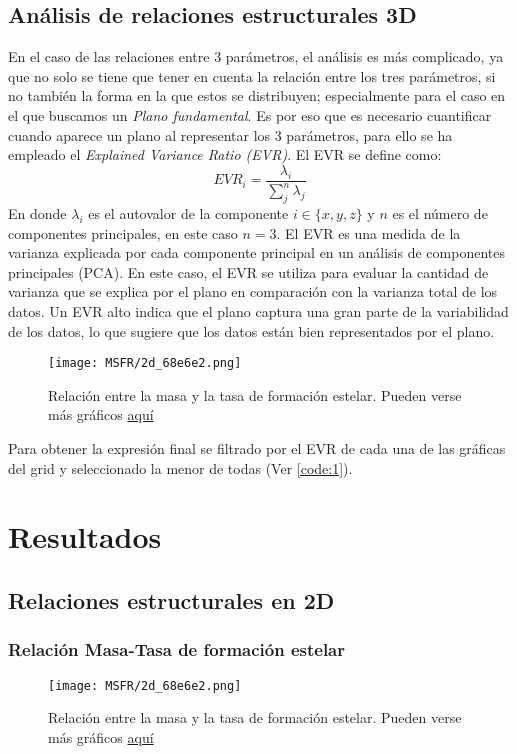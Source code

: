 \documentclass[11pt, a4paper]{article} %
\begin{document}
\subsection{Análisis de relaciones estructurales 3D}

En el caso de las relaciones entre 3 parámetros, el análisis es más complicado, ya que no solo se tiene que tener en cuenta la relación entre los tres parámetros, si no también la forma en la que estos se distribuyen; especialmente para el caso en el que buscamos un \textit{Plano fundamental}. 
Es por eso que es necesario cuantificar cuando aparece un plano al representar los 3 parámetros, para ello se ha empleado el \textit{Explained Variance Ratio (EVR)}. El EVR se define como:
\begin{equation}
    EVR_i=\frac{\lambda_i}{\sum_j^n\lambda_j}
\end{equation}
En donde $\lambda_i$ es el autovalor de la componente $i\in\{x,y,z\}$ y $n$ es el número de componentes principales, en este caso $n=3$.
El EVR es una medida de la varianza explicada por cada componente principal en un análisis de componentes principales (PCA). 
En este caso, el EVR se utiliza para evaluar la cantidad de varianza que se explica por el plano en comparación con la varianza total de los datos. Un EVR alto indica que el plano captura una gran parte de la variabilidad de los datos, lo que sugiere que los datos están bien representados por el plano.

\begin{figure}[H]
    \centering
    \texttt{[image: MSFR/2d\_68e6e2.png]}
    \caption{Relación entre la masa y la tasa de formación estelar. Pueden verse más gráficos \href{https://github.com/PhyAMR/TFG/tree/main/MSFR}{aquí}}
    \label{fig:MSFR}
\end{figure}

Para obtener la expresión final se filtrado por el EVR de cada una de las gráficas del grid y seleccionado la menor de todas (Ver \ref{code:1}).



\section{Resultados}

\subsection{Relaciones estructurales en 2D}
\subsubsection{Relación Masa-Tasa de formación estelar}
\begin{figure}[H]
    \centering
    \texttt{[image: MSFR/2d\_68e6e2.png]}
    \caption{Relación entre la masa y la tasa de formación estelar. Pueden verse más gráficos \href{https://github.com/PhyAMR/TFG/tree/main/MSFR}{aquí}}
    \label{fig:MSFR}
\end{figure}
\end{document}
